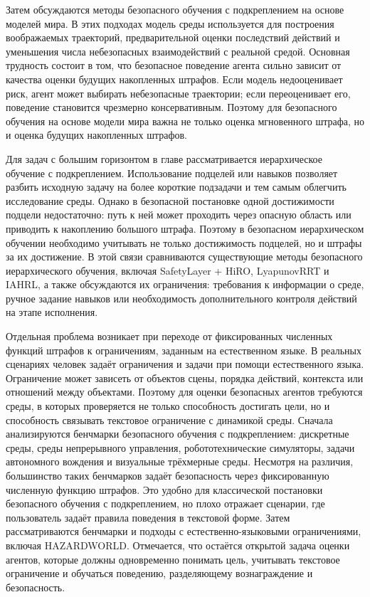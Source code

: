 Затем обсуждаются методы безопасного обучения с подкреплением на основе моделей мира. В этих подходах модель среды используется для построения воображаемых траекторий, предварительной оценки последствий действий и уменьшения числа небезопасных взаимодействий с реальной средой. Основная трудность состоит в том, что безопасное поведение агента сильно зависит от качества оценки будущих накопленных штрафов. Если модель недооценивает риск, агент может выбирать небезопасные траектории; если переоценивает его, поведение становится чрезмерно консервативным. Поэтому для безопасного обучения на основе модели мира важна не только оценка мгновенного штрафа, но и оценка будущих накопленных штрафов.

Для задач с большим горизонтом в главе рассматривается иерархическое обучение с подкреплением. Использование подцелей или навыков позволяет разбить исходную задачу на более короткие подзадачи и тем самым облегчить исследование среды. Однако в безопасной постановке одной достижимости подцели недостаточно: путь к ней может проходить через опасную область или приводить к накоплению большого штрафа. Поэтому в безопасном иерархическом обучении необходимо учитывать не только достижимость подцелей, но и штрафы за их достижение. В этой связи сравниваются существующие методы безопасного иерархического обучения, включая SafetyLayer + HiRO, LyapunovRRT и IAHRL, а также обсуждаются их ограничения: требования к информации о среде, ручное задание навыков или необходимость дополнительного контроля действий на этапе исполнения.

Отдельная проблема возникает при переходе от фиксированных численных функций штрафов к ограничениям, заданным на естественном языке. В реальных сценариях человек задаёт ограничения и задачи при помощи естественного языка. Ограничение может зависеть от объектов сцены, порядка действий, контекста или отношений между объектами. Поэтому для оценки безопасных агентов требуются среды, в которых проверяется не только способность достигать цели, но и способность связывать текстовое ограничение с динамикой среды. Сначала анализируются бенчмарки безопасного обучения с подкреплением: дискретные среды, среды непрерывного управления, робототехнические симуляторы, задачи автономного вождения и визуальные трёхмерные среды. Несмотря на различия, большинство таких бенчмарков задаёт безопасность через фиксированную численную функцию штрафов. Это удобно для классической постановки безопасного обучения с подкреплением, но плохо отражает сценарии, где пользователь задаёт правила поведения в текстовой форме. Затем рассматриваются бенчмарки и подходы с естественно-языковыми ограничениями, включая HAZARDWORLD. Отмечается, что остаётся открытой задача оценки агентов, которые должны одновременно понимать цель, учитывать текстовое ограничение и обучаться поведению, разделяющему вознаграждение и безопасность.

